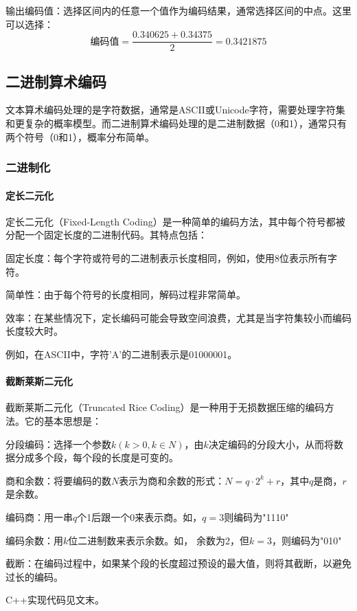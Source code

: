 \documentclass{/Users/hi/Study/template/code}
\begin{document}
\begin{tcolorbox}
\begin{serialNumber}
		\item 输出编码值：选择区间内的任意一个值作为编码结果，通常选择区间的中点。这里可以选择：
		\begin{equation}
			\text{编码值} = \frac{0.340625 + 0.34375}{2} = 0.3421875
		\end{equation}
	\end{serialNumber}
\end{tcolorbox}


\subsection{二进制算术编码}
文本算术编码处理的是字符数据，通常是ASCII或Unicode字符，需要处理字符集和更复杂的概率模型。而二进制算术编码处理的是二进制数据（0和1），通常只有两个符号（0和1），概率分布简单。

\subsubsection{二进制化}
\paragraph{定长二元化}
定长二元化（Fixed-Length Coding）是一种简单的编码方法，其中每个符号都被分配一个固定长度的二进制代码。其特点包括：

固定长度：每个字符或符号的二进制表示长度相同，例如，使用8位表示所有字符。

简单性：由于每个符号的长度相同，解码过程非常简单。

效率：在某些情况下，定长编码可能会导致空间浪费，尤其是当字符集较小而编码长度较大时。

例如，在ASCII中，字符'A'的二进制表示是01000001。


\paragraph{截断莱斯二元化}
截断莱斯二元化（Truncated Rice Coding）是一种用于无损数据压缩的编码方法。它的基本思想是：
\begin{serialNumber}
	\item 分段编码：选择一个参数$k ( k > 0 , k \in N )$，由$k$决定编码的分段大小，从而将数据分成多个段，每个段的长度是可变的。
	\item 商和余数：将要编码的数$ N $表示为商和余数的形式：\( N = q \cdot 2^k + r \)，其中\( q \)是商，\( r \)是余数。
	\item 编码商：用一串\( q \)个1后跟一个0来表示商。如，$q = 3$则编码为"1110"
	\item 编码余数：用\( k \)位二进制数来表示余数。如， 余数为2，但$k = 3$，则编码为"010"
	\item 截断：在编码过程中，如果某个段的长度超过预设的最大值，则将其截断，以避免过长的编码。
\end{serialNumber}
C++实现代码见文末。
\end{document}
